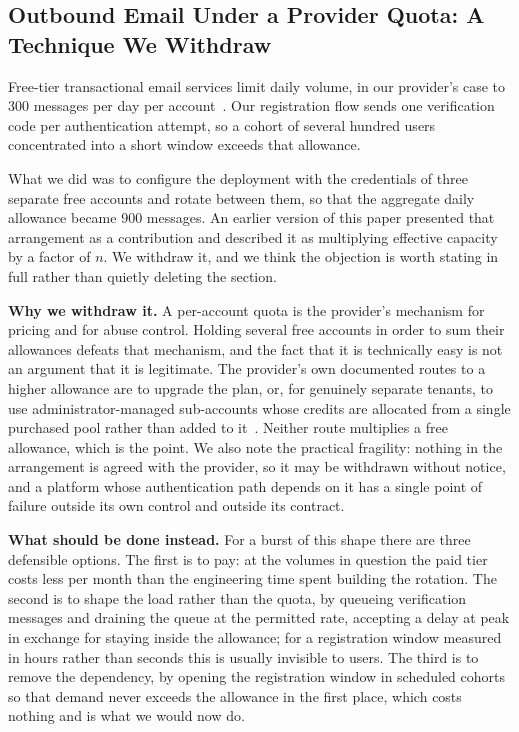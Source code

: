 \documentclass[11pt,a4paper]{article}
\theoremstyle{plain}
\theoremstyle{definition}
\theoremstyle{remark}
\begin{document}
\subsection{Outbound Email Under a Provider Quota: A Technique We Withdraw}
\label{subsec:roundrobin}

Free-tier transactional email services limit daily volume, in our provider's case to 300 messages per day per account~\cite{brevo-limits}. Our registration flow sends one verification code per authentication attempt, so a cohort of several hundred users concentrated into a short window exceeds that allowance.

What we did was to configure the deployment with the credentials of three separate free accounts and rotate between them, so that the aggregate daily allowance became 900 messages. An earlier version of this paper presented that arrangement as a contribution and described it as multiplying effective capacity by a factor of $n$. We withdraw it, and we think the objection is worth stating in full rather than quietly deleting the section.

\textbf{Why we withdraw it.} A per-account quota is the provider's mechanism for pricing and for abuse control. Holding several free accounts in order to sum their allowances defeats that mechanism, and the fact that it is technically easy is not an argument that it is legitimate. The provider's own documented routes to a higher allowance are to upgrade the plan, or, for genuinely separate tenants, to use administrator-managed sub-accounts whose credits are allocated from a single purchased pool rather than added to it~\cite{brevo-limits}. Neither route multiplies a free allowance, which is the point. We also note the practical fragility: nothing in the arrangement is agreed with the provider, so it may be withdrawn without notice, and a platform whose authentication path depends on it has a single point of failure outside its own control and outside its contract.

\textbf{What should be done instead.} For a burst of this shape there are three defensible options. The first is to pay: at the volumes in question the paid tier costs less per month than the engineering time spent building the rotation. The second is to shape the load rather than the quota, by queueing verification messages and draining the queue at the permitted rate, accepting a delay at peak in exchange for staying inside the allowance; for a registration window measured in hours rather than seconds this is usually invisible to users. The third is to remove the dependency, by opening the registration window in scheduled cohorts so that demand never exceeds the allowance in the first place, which costs nothing and is what we would now do.
\end{document}
